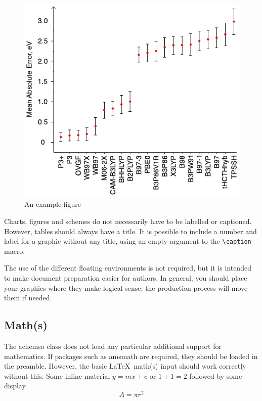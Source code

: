 \documentclass[journal=jacsat,manuscript=communication]{achemso}
\begin{document}
\begin{figure}
  \includegraphics{fig_1_AE+sigma}
  \caption{An example figure}
  \label{fgr:example}
\end{figure}

Charts, figures and schemes do not necessarily have to be labelled or
captioned.  However, tables should always have a title. It is
possible to include a number and label for a graphic without any
title, using an empty argument to the \texttt{\textbackslash caption}
macro.

The use of the different floating environments is not required, but
it is intended to make document preparation easier for authors. In
general, you should place your graphics where they make logical
sense; the production process will move them if needed.

\subsection{Math(s)}

The \textsf{achemso} class does not load any particular additional
support for mathematics.  If packages such as \textsf{amsmath} are
required, they should be loaded in the preamble.  However,
the basic \LaTeX\ math(s) input should work correctly without
this.  Some inline material \( y = mx + c \) or $ 1 + 1 = 2 $
followed by some display. \[ A = \pi r^2 \]
\end{document}
